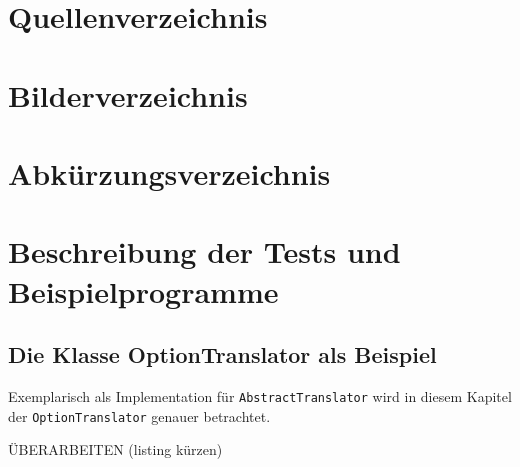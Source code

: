 \documentclass[12pt]{scrreprt}
\begin{document}
\section{Quellenverzeichnis}


\section{Bilderverzeichnis}


\section{Abkürzungsverzeichnis}

\begin{acronym}[TU-Berlin]
 \acro{}{}
\end{acronym}


\section{Beschreibung der Tests und Beispielprogramme}


\subsection{Die Klasse OptionTranslator als Beispiel}
\label{subsec:option-translator}

Exemplarisch als Implementation für \lstinline!AbstractTranslator! wird in diesem Kapitel der \lstinline!OptionTranslator! genauer betrachtet.

ÜBERARBEITEN (listing kürzen)
\end{document}
